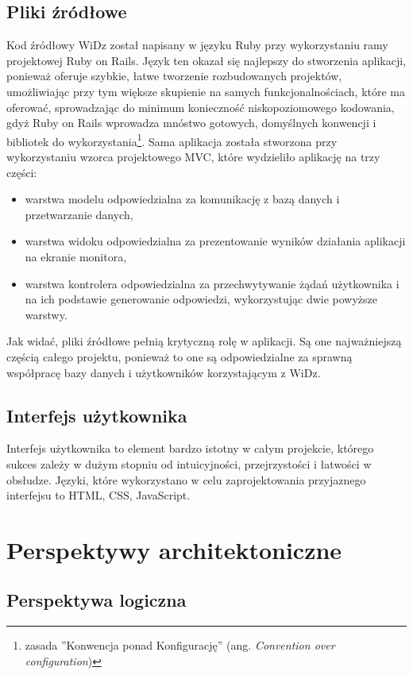 \documentclass[12pt,leqno,twoside]{mwart}
\begin{document}
\subsection{Pliki źródłowe}
\noindent Kod źródłowy WiDz został napisany w języku Ruby przy wykorzystaniu ramy projektowej Ruby on Rails. Język ten okazał się najlepszy do stworzenia aplikacji, ponieważ oferuje szybkie, łatwe tworzenie rozbudowanych projektów, umożliwiając przy tym większe skupienie na samych funkcjonalnościach, które ma oferować, sprowadzając do minimum konieczność niskopoziomowego kodowania, gdyż Ruby on Rails wprowadza mnóstwo gotowych, domyślnych konwencji i bibliotek do wykorzystania\footnote{zasada ''Konwencja ponad Konfigurację'' (ang. \textit{Convention over configuration})}. Sama aplikacja została stworzona przy wykorzystaniu wzorca projektowego MVC, które wydzieliło aplikację na trzy części:
\begin{itemize}
\item warstwa modelu odpowiedzialna za komunikację z bazą danych i przetwarzanie danych,
\item warstwa widoku odpowiedzialna za prezentowanie wyników działania aplikacji na ekranie monitora,
\item warstwa kontrolera odpowiedzialna za przechwytywanie żądań użytkownika i na ich podstawie generowanie odpowiedzi, wykorzystując dwie powyższe warstwy.
\end{itemize}
Jak widać, pliki źródłowe pełnią krytyczną rolę w aplikacji. Są one najważniejszą częścią całego projektu, ponieważ to one są odpowiedzialne za sprawną współpracę bazy danych i użytkowników korzystającym z WiDz.

\subsection{Interfejs użytkownika}
\noindent Interfejs użytkownika to element bardzo istotny w całym projekcie, którego sukces zależy w dużym stopniu od intuicyjności, przejrzystości i łatwości w obsłudze. Języki, które wykorzystano w celu zaprojektowania przyjaznego interfejsu to HTML, CSS, JavaScript. 

\section{Perspektywy architektoniczne}
\subsection{Perspektywa logiczna}
\end{document}
